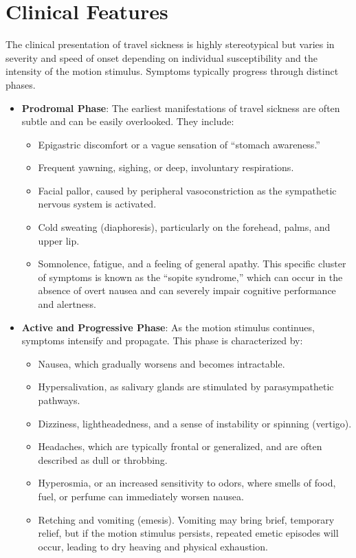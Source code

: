 \section*{Clinical Features}
The clinical presentation of travel sickness is highly stereotypical but varies in severity and speed of onset depending on individual susceptibility and the intensity of the motion stimulus. Symptoms typically progress through distinct phases.
\begin{itemize}
    \item \textbf{Prodromal Phase}: The earliest manifestations of travel sickness are often subtle and can be easily overlooked. They include:
    \begin{itemize}
        \item Epigastric discomfort or a vague sensation of ``stomach awareness.''
        \item Frequent yawning, sighing, or deep, involuntary respirations.
        \item Facial pallor, caused by peripheral vasoconstriction as the sympathetic nervous system is activated.
        \item Cold sweating (diaphoresis), particularly on the forehead, palms, and upper lip.
        \item Somnolence, fatigue, and a feeling of general apathy. This specific cluster of symptoms is known as the ``sopite syndrome,'' which can occur in the absence of overt nausea and can severely impair cognitive performance and alertness.
    \end{itemize}
    \item \textbf{Active and Progressive Phase}: As the motion stimulus continues, symptoms intensify and propagate. This phase is characterized by:
    \begin{itemize}
        \item Nausea, which gradually worsens and becomes intractable.
        \item Hypersalivation, as salivary glands are stimulated by parasympathetic pathways.
        \item Dizziness, lightheadedness, and a sense of instability or spinning (vertigo).
        \item Headaches, which are typically frontal or generalized, and are often described as dull or throbbing.
        \item Hyperosmia, or an increased sensitivity to odors, where smells of food, fuel, or perfume can immediately worsen nausea.
        \item Retching and vomiting (emesis). Vomiting may bring brief, temporary relief, but if the motion stimulus persists, repeated emetic episodes will occur, leading to dry heaving and physical exhaustion.

\end{itemize}
\end{itemize}
